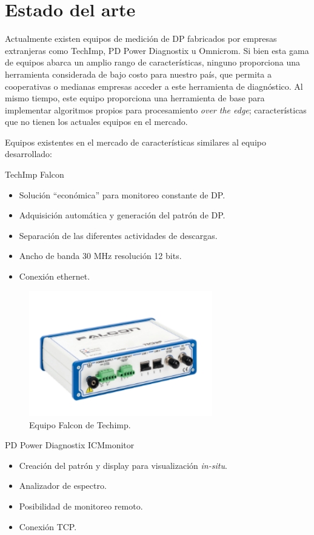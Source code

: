 \section{Estado del arte}
Actualmente existen equipos de medición de DP fabricados por empresas extranjeras como TechImp, PD Power Diagnostix u Omnicrom. Si bien esta gama de equipos abarca un amplio rango de características, ninguno proporciona una herramienta considerada de bajo costo para nuestro país, que permita a cooperativas o medianas empresas acceder a este herramienta de diagnóstico. Al mismo tiempo, este equipo proporciona una herramienta de base para implementar algoritmos propios para procesamiento \textit{over the edge}; características que no tienen los actuales equipos en el mercado. 

Equipos existentes en el mercado de características similares al equipo desarrollado:

TechImp Falcon \citep{falconWeb:1}
\begin{itemize}
\item Solución “económica” para monitoreo constante de DP.
\item Adquisición automática y generación del patrón de DP.
\item Separación de las diferentes actividades de descargas.
\item Ancho de banda 30 MHz resolución 12 bits.
\item Conexión ethernet.
\end{itemize}

\begin{figure}[h!]
	\centering
	\includegraphics[width=80mm]{./Figures/arte1.png}
	\caption{Equipo Falcon de Techimp.}
	\label{fig:arte1}
\end{figure}


\vspace{15mm}
PD Power Diagnostix ICMmonitor \citep{pdWeb:1}
\begin{itemize}
\item Creación del patrón y display para visualización \textit{in-situ}.
\item Analizador de espectro.
\item Posibilidad de monitoreo remoto.
\item Conexión TCP.
\end{itemize}

